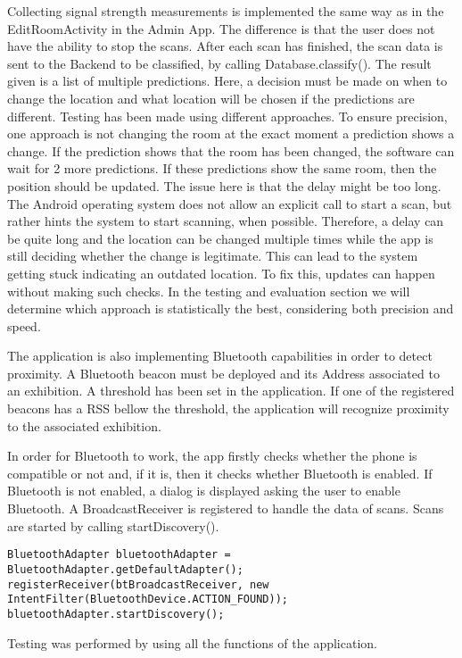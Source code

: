 Collecting signal strength measurements is implemented the same way as in the EditRoomActivity in the Admin App. The difference is that the user does not have the ability to stop the scans. After each scan has finished, the scan data is sent to the Backend to be classified, by calling Database.classify(). The result given is a list of multiple predictions. Here, a decision must be made on when to change the location and what location will be chosen if the predictions are different. Testing has been made using different approaches. To ensure precision, one approach is not changing the room at the exact moment a prediction shows a change. If the prediction shows that the room has been changed, the software can wait for 2 more predictions. If these predictions show the same room, then the position should be updated. The issue here is that the delay might be too long. The Android operating system does not allow an explicit call to start a scan, but rather hints the system to start scanning, when possible. Therefore, a delay can be quite long and the location can be changed multiple times while the app is still deciding whether the change is legitimate. This can lead to the system getting stuck indicating an outdated location. To fix this, updates can happen without making such checks. In the testing and evaluation section we will determine which approach is statistically the best, considering both precision and speed.

The application is also implementing Bluetooth capabilities in order to detect proximity. A Bluetooth beacon must be deployed and its Address associated to an exhibition. A threshold has been set in the application. If one of the registered beacons has a RSS bellow the threshold, the application will recognize proximity to the associated exhibition. 

In order for Bluetooth to work, the app firstly checks whether the phone is compatible or not and, if it is, then it checks whether Bluetooth is enabled. If Bluetooth is not enabled, a dialog is displayed asking the user to enable Bluetooth. A BroadcastReceiver is registered to handle the data of scans. Scans are started by calling startDiscovery().
\begin{lstlisting}
BluetoothAdapter bluetoothAdapter = BluetoothAdapter.getDefaultAdapter();
registerReceiver(btBroadcastReceiver, new IntentFilter(BluetoothDevice.ACTION_FOUND));
bluetoothAdapter.startDiscovery();
\end{lstlisting}

Testing was performed by using all the functions of the application.
